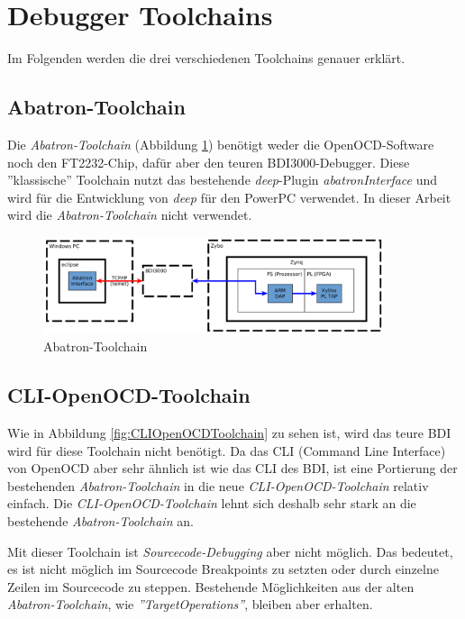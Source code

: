 \FloatBarrier
\section{Debugger Toolchains}
Im Folgenden werden die drei verschiedenen Toolchains genauer erklärt.

\subsection{Abatron-Toolchain}
Die \textit{Abatron-Toolchain} (Abbildung \ref{fig:AbatronToolchain}) benötigt weder die OpenOCD-Software noch den FT2232-Chip, dafür aber den teuren BDI3000-Debugger.
Diese ''klassische'' Toolchain nutzt das bestehende \textit{deep}-Plugin \textit{abatronInterface} und wird für die Entwicklung von \textit{deep} für den PowerPC verwendet.
In dieser Arbeit wird die \textit{Abatron-Toolchain} nicht verwendet.

\begin{figure}[htbp]
	\centering
		\includegraphics[width=10cm,height=\textheight,keepaspectratio]{graphs/abatronToolchain.png}
	\caption{Abatron-Toolchain}
	\label{fig:AbatronToolchain}
\end{figure}


\FloatBarrier
\subsection{CLI-OpenOCD-Toolchain}
Wie in Abbildung \ref{fig:CLIOpenOCDToolchain} zu sehen ist, wird das teure BDI wird für diese Toolchain nicht  benötigt.
Da das CLI (Command Line Interface) von OpenOCD aber sehr ähnlich ist wie das CLI des BDI, ist eine Portierung der bestehenden \textit{Abatron-Toolchain} in die neue \textit{CLI-OpenOCD-Toolchain} relativ einfach.
Die \textit{CLI-OpenOCD-Toolchain} lehnt sich deshalb sehr stark an die bestehende \textit{Abatron-Toolchain} an.

Mit dieser Toolchain ist \textit{Sourcecode-Debugging} aber nicht möglich.
Das bedeutet, es ist nicht möglich im Sourcecode Breakpoints zu setzten oder durch einzelne Zeilen im Sourcecode zu steppen.
Bestehende Möglichkeiten aus der alten \textit{Abatron-Toolchain}, wie \textit{''TargetOperations''}, bleiben aber erhalten.


